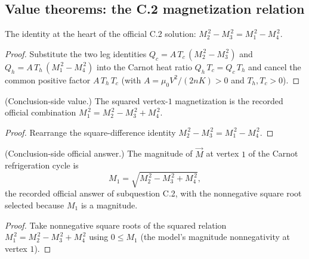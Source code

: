 \subsection*{Value theorems: the C.2 magnetization relation}

\begin{theorem}
\label{thm:IPhO2026Problems_problem_IPhO_2026_3_C_2:sq_diff_eq}
The identity at the heart of the official C.2 solution:
$M_2^{\,2} - M_3^{\,2} = M_1^{\,2} - M_4^{\,2}$.
\end{theorem}
\begin{proof}
Substitute the two leg identities $Q_c = A\,T_c\,(M_2^{\,2}-M_3^{\,2})$
and $Q_h = A\,T_h\,(M_1^{\,2}-M_4^{\,2})$ into the Carnot heat ratio
$Q_h\,T_c = Q_c\,T_h$ and cancel the common positive factor
$A\,T_h\,T_c$ (with $A = \mu_0 V^2/(2nK) > 0$ and $T_h, T_c > 0$).
\end{proof}

\begin{theorem}
\label{thm:IPhO2026Problems_problem_IPhO_2026_3_C_2:m1_sq}
(Conclusion-side value.) The squared vertex-$1$ magnetization is the
recorded official combination
$M_1^{\,2} = M_2^{\,2} - M_3^{\,2} + M_4^{\,2}$.
\end{theorem}
\begin{proof}
Rearrange the square-difference identity
$M_2^{\,2} - M_3^{\,2} = M_1^{\,2} - M_4^{\,2}$.
\end{proof}

\begin{theorem}
\label{thm:IPhO2026Problems_problem_IPhO_2026_3_C_2:m1_eq_sqrt}
(Conclusion-side official answer.) The magnitude of $\vec M$ at
vertex $1$ of the Carnot refrigeration cycle is
\[
M_1 = \sqrt{M_2^{\,2} - M_3^{\,2} + M_4^{\,2}},
\]
the recorded official answer of subquestion C.2, with the nonnegative
square root selected because $M_1$ is a magnitude.
\end{theorem}
\begin{proof}
Take nonnegative square roots of the squared relation
$M_1^{\,2} = M_2^{\,2} - M_3^{\,2} + M_4^{\,2}$ using
$0 \le M_1$ (the model's magnitude nonnegativity at vertex $1$).
\end{proof}

